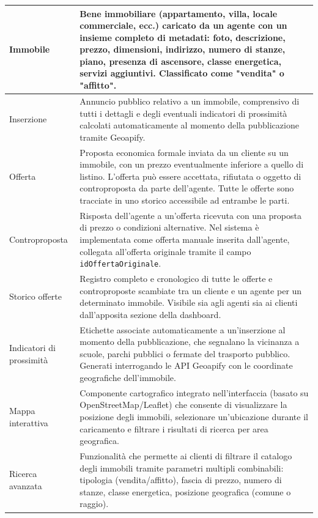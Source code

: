 \documentclass[a4paper,11pt]{article}
\begin{document}
\begin{longtable}{|p{4.2cm}|p{10.5cm}|}
Immobile &
Bene immobiliare (appartamento, villa, locale commerciale, ecc.) caricato da un agente con un insieme completo di metadati: foto, descrizione, prezzo, dimensioni, indirizzo, numero di stanze, piano, presenza di ascensore, classe energetica, servizi aggiuntivi. Classificato come "vendita" o "affitto". \\ \hline

Inserzione &
Annuncio pubblico relativo a un immobile, comprensivo di tutti i dettagli e degli eventuali indicatori di prossimità calcolati automaticamente al momento della pubblicazione tramite Geoapify. \\ \hline

Offerta &
Proposta economica formale inviata da un cliente su un immobile, con un prezzo eventualmente inferiore a quello di listino. L'offerta può essere accettata, rifiutata o oggetto di controproposta da parte dell'agente. Tutte le offerte sono tracciate in uno storico accessibile ad entrambe le parti. \\ \hline

Controproposta &
Risposta dell'agente a un'offerta ricevuta con una proposta di prezzo o condizioni alternative. Nel sistema è implementata come offerta manuale inserita dall'agente, collegata all'offerta originale tramite il campo \texttt{idOffertaOriginale}. \\ \hline

Storico offerte &
Registro completo e cronologico di tutte le offerte e controproposte scambiate tra un cliente e un agente per un determinato immobile. Visibile sia agli agenti sia ai clienti dall'apposita sezione della dashboard. \\ \hline

Indicatori di prossimità &
Etichette associate automaticamente a un'inserzione al momento della pubblicazione, che segnalano la vicinanza a scuole, parchi pubblici o fermate del trasporto pubblico. Generati interrogando le API Geoapify con le coordinate geografiche dell'immobile. \\ \hline

Mappa interattiva &
Componente cartografico integrato nell'interfaccia (basato su OpenStreetMap/Leaflet) che consente di visualizzare la posizione degli immobili, selezionare un'ubicazione durante il caricamento e filtrare i risultati di ricerca per area geografica. \\ \hline

Ricerca avanzata &
Funzionalità che permette ai clienti di filtrare il catalogo degli immobili tramite parametri multipli combinabili: tipologia (vendita/affitto), fascia di prezzo, numero di stanze, classe energetica, posizione geografica (comune o raggio). \\ \hline


\end{longtable}
\end{document}

